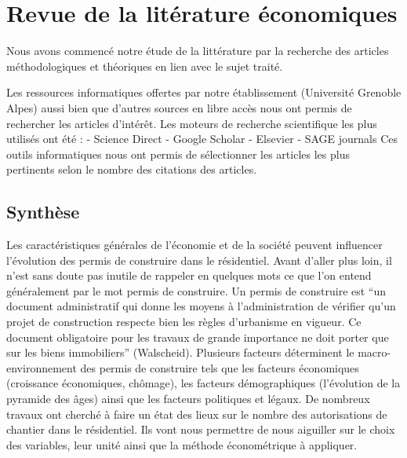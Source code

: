 \documentclass[11pt,]{article}
\begin{document}
\hypertarget{revue-de-la-literature-economiques}{%
\section{Revue de la litérature
économiques}\label{revue-de-la-literature-economiques}}

Nous avons commencé notre étude de la littérature par la recherche des
articles méthodologiques et théoriques en lien avec le sujet traité.

Les ressources informatiques offertes par notre établissement
(Université Grenoble Alpes) aussi bien que d'autres sources en libre
accès nous ont permis de rechercher les articles d'intérêt. Les moteurs
de recherche scientifique les plus utilisés ont été : - Science Direct -
Google Scholar - Elsevier - SAGE journals Ces outils informatiques nous
ont permis de sélectionner les articles les plus pertinents selon le
nombre des citations des articles.

\hypertarget{synthese}{%
\subsection{Synthèse}\label{synthese}}

Les caractéristiques générales de l'économie et de la société peuvent
influencer l'évolution des permis de construire dans le résidentiel.
Avant d'aller plus loin, il n'est sans doute pas inutile de rappeler en
quelques mots ce que l'on entend généralement par le mot permis de
construire. Un permis de construire est ``un document administratif qui
donne les moyens à l'administration de vérifier qu'un projet de
construction respecte bien les règles d'urbanisme en vigueur. Ce
document obligatoire pour les travaux de grande importance ne doit
porter que sur les biens immobiliers'' (Walscheid). Plusieurs facteurs
déterminent le macro-environnement des permis de construire tels que les
facteurs économiques (croissance économiques, chômage), les facteurs
démographiques (l'évolution de la pyramide des âges) ainsi que les
facteurs politiques et légaux. De nombreux travaux ont cherché à faire
un état des lieux sur le nombre des autorisations de chantier dans le
résidentiel. Ils vont nous permettre de nous aiguiller sur le choix des
variables, leur unité ainsi que la méthode économétrique à appliquer.

\newpage
\end{document}

